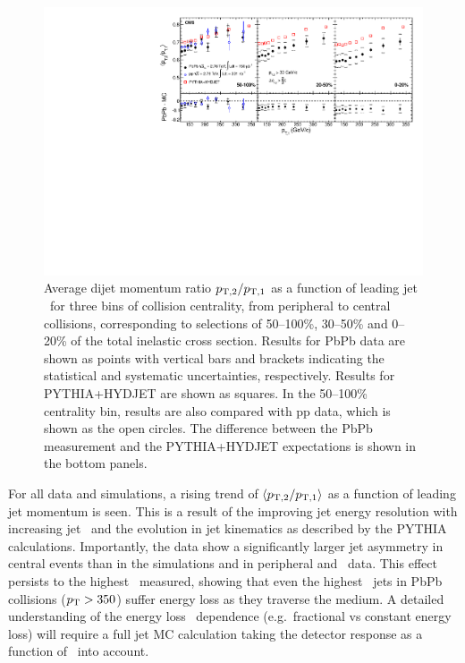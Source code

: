 \begin{figure}[!h]
\begin{center}
\includegraphics[width=0.49\mboxwidth]{jetfigures/deltaPtOverPt5_lead120_sub30_diff_20120103.pdf}
\caption[]{Average dijet momentum ratio $p_{\rm{T},2}/p_{\rm{T},1}$ as a function of
leading jet \pT\ for three bins of collision centrality, from peripheral to central collisions,
corresponding to selections of 50--100\%,  30--50\% and 0--20\%  of the total inelastic cross section.
Results for PbPb data are shown as points with vertical bars and brackets indicating
the statistical and systematic uncertainties, respectively.  Results for PYTHIA+HYDJET are shown as squares. In the 50--100\% centrality bin,
results are also compared with pp data, which is shown as the open circles.
The difference between the PbPb measurement and the PYTHIA+HYDJET expectations is shown in the bottom panels. }
\label{fig:GR:CMS_pt_ratio}
\end{center}
\end{figure}

For all data and simulations, a rising trend of $\langle p_{\rm{T},2}/p_{\rm{T},1} \rangle$ as a function
of leading jet momentum is seen. This is a result of the improving jet energy resolution
with increasing jet \pT\ and the evolution in jet kinematics as described by the PYTHIA 
calculations. Importantly, the data show a significantly larger jet asymmetry in central events
than in the simulations and in peripheral and \pp\ data. This effect persists to the 
highest \pT\ measured, showing that even the highest \pT\ jets in PbPb collisions ($p_{\rm{T}} > 350$\GeVc)
suffer energy loss as they traverse the medium. A detailed understanding of the energy loss
\pT\ dependence (e.g.\ fractional vs constant energy loss) will require a full jet MC calculation
taking the detector response as a function of \pT\ into account.

